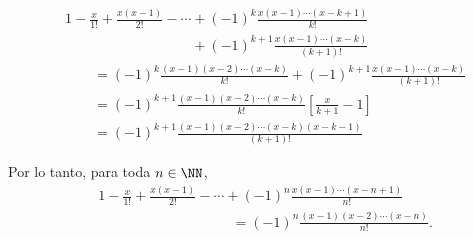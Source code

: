 \begin{examplebox}{}{}
\begin{enumerate}[label=\roman*., topsep=6pt, itemsep=0pt]
\begin{align*}
            & 1 - \frac{x}{1!} + \frac{x(x - 1)}{2!} - \cdots + (-1)^k \frac{x(x - 1) \cdots (x - k + 1)}{k!} \\
            & \phantom{1 - \frac{x}{1!} + \frac{x(x - 1)}{2!} - \cdots} + (-1)^{k + 1} \frac{x(x - 1) \cdots (x - k)}{(k + 1)!} \\
            & \qquad = (-1)^k \frac{(x - 1)(x - 2) \cdots (x - k)}{k!} + (-1)^{k + 1} \frac{x(x - 1) \cdots (x - k)}{(k + 1)!} \\
            & \qquad = (-1)^{k + 1} \frac{(x - 1)(x - 2) \cdots (x - k)}{k!} \left[ \frac{x}{k + 1} - 1 \right] \\
            & \qquad = (-1)^{k + 1} \frac{(x - 1)(x - 2) \cdots (x - k)(x - k - 1)}{(k + 1)!}
        \end{align*}
    \end{enumerate}
    Por lo tanto, para toda $n \in \NN$,
    \begin{align*}
        & 1 - \frac{x}{1!} + \frac{x(x - 1)}{2!} - \cdots + (-1)^n \frac{x(x - 1) \cdots (x - n + 1)}{n!} \\
        & \hspace{4cm} = (-1)^n \frac{(x - 1)(x - 2) \cdots (x - n)}{n!}.
    \end{align*}
\end{examplebox}

\newpage

